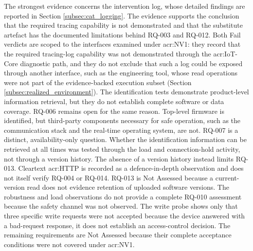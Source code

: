 The strongest evidence concerns the intervention log, whose detailed findings are reported in Section \ref{subsec:cat_logging}. The evidence supports the conclusion that the required tracing capability is not demonstrated and that the substitute artefact has the documented limitations behind RQ-003 and RQ-012. Both Fail verdicts are scoped to the interfaces examined under \gls{acr:NV1}: they record that the required tracing-log capability was not demonstrated through the \gls{acr:IoT}-Core diagnostic path, and they do not exclude that such a log could be exposed through another interface, such as the engineering tool, whose read operations were not part of the evidence-backed execution subset (Section \ref{subsec:realized_environment}). The identification tests demonstrate product-level information retrieval, but they do not establish complete software or data coverage. RQ-006 remains open for the same reason. Top-level firmware is identified, but third-party components necessary for safe operation, such as the communication stack and the real-time operating system, are not. RQ-007 is a distinct, availability-only question. Whether the identification information can be retrieved at all times was tested through the load and connection-hold activity, not through a version history. The absence of a version history instead limits RQ-013. Cleartext \gls{acr:HTTP} is recorded as a defence-in-depth observation and does not itself verify RQ-004 or RQ-014. RQ-013 is Not Assessed because a current-version read does not evidence retention of uploaded software versions. The robustness and load observations do not provide a complete RQ-010 assessment because the safety channel was not observed. The write probe shows only that three specific write requests were not accepted because the device answered with a bad-request response, it does not establish an access-control decision. The remaining requirements are Not Assessed because their complete acceptance conditions were not covered under \gls{acr:NV1}.


